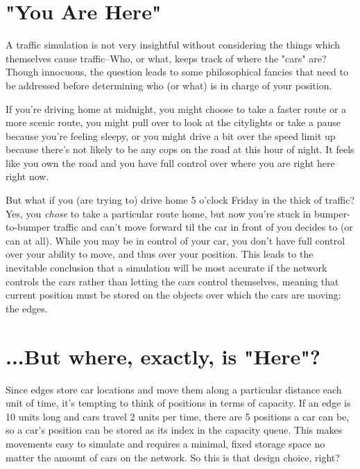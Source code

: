 \section{"You Are Here"}

\par A traffic simulation is not very insightful without considering the things which themselves cause traffic--Who, or what, keeps track of where the "cars" are?  Though innocuous, the question leads to some philosophical fancies that need to be addressed before determining who (or what) is in charge of your position. \\

\par If you're driving home at midnight, you might choose to take a faster route or a more scenic route, you might pull over to look at the citylights or take a pause because you're feeling sleepy, or you might drive a bit over the speed limit up because there's not likely to be any cops on the road at this hour of night.  It feels like you own the road and you have full control over where you are right here right now.  \\

\par But what if you (are trying to) drive home 5 o'clock Friday in the thick of traffic?  Yes, you \textit{chose} to take a particular route home, but now you're stuck in bumper-to-bumper traffic and can't move forward til the car in front of you decides to (or can at all).  While you may be in control of your car, you don't have full control over your ability to move, and thus over your position.  This leads to the inevitable conclusion that a simulation will be most accurate if the network controls the cars rather than letting the cars control themselves, meaning that current position must be stored on the objects over which the cars are moving:  the edges.

\section{...But where, exactly, is "Here"?}

\par Since edges store car locations and move them along a particular distance each unit of time, it's tempting to think of positions in terms of capacity.  If an edge is 10 units long and cars travel 2 units per time, there are 5 positions a car can be, so a car's position can be stored as its index in the capacity queue.  This makes movements easy to simulate and requires a minimal, fixed storage space no matter the amount of cars on the network.  So this is that design choice, right? \\

